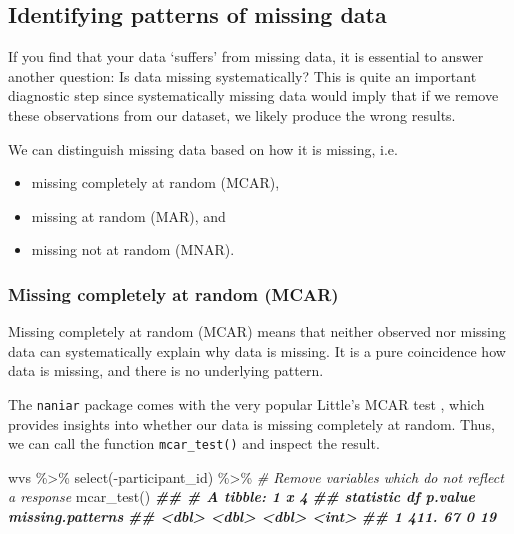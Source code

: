\documentclass[
]{book}
\newenvironment{Shaded}{\begin{snugshade}}{\end{snugshade}}
\newcommand{\CommentTok}[1]{\textcolor[rgb]{0.56,0.35,0.01}{\textit{#1}}}
\newcommand{\DocumentationTok}[1]{\textcolor[rgb]{0.56,0.35,0.01}{\textbf{\textit{#1}}}}
\newcommand{\FunctionTok}[1]{\textcolor[rgb]{0.00,0.00,0.00}{#1}}
\newcommand{\NormalTok}[1]{#1}
\newcommand{\SpecialCharTok}[1]{\textcolor[rgb]{0.00,0.00,0.00}{#1}}
\begin{document}
\hypertarget{patterns-of-missing-data}{%
\subsection{Identifying patterns of missing data}\label{patterns-of-missing-data}}

If you find that your data `suffers' from missing data, it is essential to answer another question: Is data missing systematically? This is quite an important diagnostic step since systematically missing data would imply that if we remove these observations from our dataset, we likely produce the wrong results.

We can distinguish missing data based on how it is missing, i.e.

\begin{itemize}
\item
  missing completely at random (MCAR),
\item
  missing at random (MAR), and
\item
  missing not at random (MNAR). \citep{rubin-1976}
\end{itemize}

\hypertarget{missing-completetly-at-random-mcar}{%
\subsubsection{Missing completely at random (MCAR)}\label{missing-completetly-at-random-mcar}}

Missing completely at random (MCAR) means that neither observed nor missing data can systematically explain why data is missing. It is a pure coincidence how data is missing, and there is no underlying pattern.

The \texttt{naniar} package comes with the very popular Little's MCAR test \citep{little-1988}, which provides insights into whether our data is missing completely at random. Thus, we can call the function \texttt{mcar\_test()} and inspect the result.

\begin{Shaded}
\begin{Highlighting}[]
\NormalTok{wvs }\SpecialCharTok{\%\textgreater{}\%}
  \FunctionTok{select}\NormalTok{(}\SpecialCharTok{{-}}\NormalTok{participant\_id) }\SpecialCharTok{\%\textgreater{}\%}     \CommentTok{\# Remove variables which do not reflect a response}
  \FunctionTok{mcar\_test}\NormalTok{()}
\DocumentationTok{\#\# \# A tibble: 1 x 4}
\DocumentationTok{\#\#   statistic    df p.value missing.patterns}
\DocumentationTok{\#\#       \textless{}dbl\textgreater{} \textless{}dbl\textgreater{}   \textless{}dbl\textgreater{}            \textless{}int\textgreater{}}
\DocumentationTok{\#\# 1      411.    67       0               19}
\end{Highlighting}
\end{Shaded}
\end{document}
